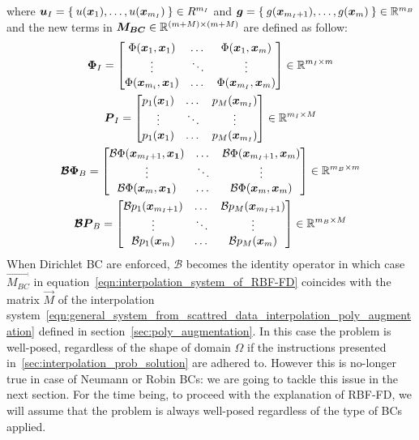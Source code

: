 where $\boldsymbol{u}_I = \Set{u(\boldsymbol{x}_1), \dots, u(\boldsymbol{x}_{m_I})} \in R^{m_I}$ and $\boldsymbol{g} = \Set{g(\boldsymbol{x}_{m_I+1}), \dots, g(\boldsymbol{x}_m)} \in \mathbb{R}^{m_B}$ and the new terms in $\boldsymbol{M_{BC}} \in \mathbb{R}^{(m+M) \times (m+M)}$ are defined as follow:
\begin{equation}
	\begin{gathered}
		\boldsymbol{\Phi}_I = \begin{bmatrix}
							\Phi(\boldsymbol{x}_1, \boldsymbol{x}_1)    	  &    \dots    & \Phi(\boldsymbol{x}_1, \boldsymbol{x}_m)  		\\
							\vdots						  	  &  \ddots		& \vdots					  		\\
							\Phi(\boldsymbol{x}_{m_i}, \boldsymbol{x}_1)    &    \dots    & \Phi(\boldsymbol{x}_{m_I}, \boldsymbol{x}_m)
					   \end{bmatrix} \in \mathbb{R}^{m_I \times m}  \\
		\boldsymbol{P}_I = \begin{bmatrix}
							p_1(\boldsymbol{x}_{1})	&  \dots  &  p_M(\boldsymbol{x}_{m_I})   \\
							\vdots				& \ddots  & \vdots					\\	
							p_1(\boldsymbol{x}_{1})	&  \dots  &  p_M(\boldsymbol{x}_{m_I})
					\end{bmatrix} \in \mathbb{R}^{m_I \times M}  \\
		\boldsymbol{\mathcal{B}\Phi}_B = \begin{bmatrix}
										\mathcal{B}\Phi(\boldsymbol{x}_{m_I+1}, \boldsymbol{x_1})  &  \dots  & \mathcal{B}\Phi(\boldsymbol{x}_{m_I+1}, \boldsymbol{x}_m)  \\
										\vdots										 & \ddots  & \vdots										  \\
										\mathcal{B}\Phi(\boldsymbol{x}_{m}, \boldsymbol{x_1})  	 &  \dots  & \mathcal{B}\Phi(\boldsymbol{x}_{m}, \boldsymbol{x}_m)
								  \end{bmatrix} \in \mathbb{R}^{m_B \times m}  \\
		\boldsymbol{\mathcal{B}P}_B = \begin{bmatrix}
									\mathcal{B}p_1(\boldsymbol{x}_{m_I+1})  &  \dots  & \mathcal{B}p_M(\boldsymbol{x}_{m_I+1})  \\
									\vdots							 & \ddots  & \vdots							  \\
									\mathcal{B}p_1(\boldsymbol{x}_{m})  	 &  \dots  & \mathcal{B}p_M(\boldsymbol{x}_{m})
							  \end{bmatrix} \in \mathbb{R}^{m_B \times M}
	\end{gathered}
\end{equation}
When Dirichlet BC are enforced, $\mathcal{B}$ becomes the identity operator in which case $\vec{M_{BC}}$ in equation~\eqref{eqn:interpolation_system_of_RBF-FD} coincides with the matrix $\vec{M}$ of the interpolation system~\eqref{eqn:general_system_from_scattred_data_interpolation_poly_augmentation} defined in section~\vref{sec:poly_augmentation}. In this case the problem is well-posed, regardless of the shape of domain $\Omega$ if the instructions presented in~\vref{sec:interpolation_prob_solution} are adhered to. However this is no-longer true in case of Neumann or Robin BCs: we are going to tackle this issue in the next section. For the time being, to proceed with the explanation of RBF-FD, we will assume that the problem is always well-posed regardless of the type of BCs applied.

